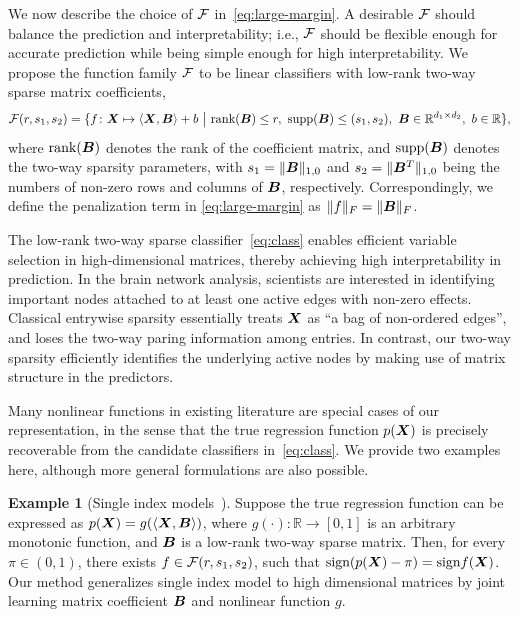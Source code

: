 \documentclass[11pt]{article}
\theoremstyle{definition}
\newtheorem{example}{Example}
\def\sign{\textup{sign}}
\begin{document}
We now describe the choice of $\mathcal{F}$ in~\eqref{eq:large-margin}. A desirable $\mathcal{F}$ should balance the prediction and interpretability; i.e., $\mathcal{F}$ should be flexible enough for accurate prediction while being simple enough for high interpretability. We propose the function family $\mathcal{F}$ to be linear classifiers with low-rank two-way sparse matrix coefficients,
\begin{align}\label{eq:class}
\tF(r,s_1,s_2)=\{f\colon \mX\mapsto \langle \mX, \mB \rangle +b \ \big|\ \text{rank}(\mB)\leq r, \ \text{supp}(\mB)\leq (s_1,s_2), \ \mB\in\mathbb{R}^{d_1\times d_2},\ b\in\mathbb{R}\},
\end{align}
where $\text{rank}(\bm B)$ denotes the rank of the coefficient matrix, and $\text{supp}(\bm B)$ denotes the two-way sparsity parameters, with $s_1=\lVert\bm B\rVert_{1,0}$ and $s_2=\lVert\bm B^T\rVert_{1,0}$ being the numbers of non-zero rows and columns of $\bm B$, respectively. Correspondingly, we define the penalization term in \eqref{eq:large-margin} as $\lVert f\rVert_F = \lVert\bm B\rVert_F$. 

The low-rank two-way sparse classifier~\eqref{eq:class} enables efficient variable selection in high-dimensional matrices, thereby achieving high interpretability in prediction. In the brain network analysis, scientists are interested in identifying important nodes attached to at least one active edges with non-zero effects. Classical entrywise sparsity essentially treats $\bm X$ as ``a bag of non-ordered edges'', and loses the two-way paring information among entries. In contrast, our two-way sparsity efficiently identifies the underlying active nodes by making use of matrix structure in the predictors. 

Many nonlinear functions in existing literature are special cases of our representation, in the sense that the true regression function $p(\bm X)$ is precisely recoverable from the candidate classifiers in~\eqref{eq:class}. We provide two examples here, although more general formulations are also possible. 

\begin{example}[Single index models~\citep{alquier2013sparse}]\label{example:1}
Suppose the true regression function can be expressed as $p(\bm X)= g(\langle \bm X,\bm B\rangle)$, where $g(\cdot)\colon \mathbb{R}\to [0,1]$ is an arbitrary monotonic function, and $\bm B$ is a low-rank two-way sparse matrix. Then, for every $\pi\in(0,1)$, there exists $f\in \mathcal{F}(r,s_1,s_2)$, such that $\sign(p(\mX)-\pi)= \sign f(\mX)$. Our method generalizes single index model to high dimensional matrices by joint learning matrix coefficient $\bm B$ and nonlinear function $g$. 
\end{example}
\end{document}
